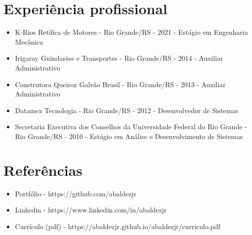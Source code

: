 \documentclass[11pt,oneside,a4paper]{article}
\begin{document}
    \section*{Experiência profissional}
    \begin{itemize}
        \item K-Rios Retífica de Motores - Rio Grande/RS - 2021 - Estágio em Engenharia Mecânica
        \item Irigaray Guindastes e Transportes - Rio Grande/RS - 2014 - Auxiliar Administrativo
        \item Construtora Queiroz Galvão Brasil - Rio Grande/RS - 2013 - Auxiliar Administrativo
        \item Datamex Tecnologia - Rio Grande/RS - 2012 - Desenvolvedor de Sistemas
        \item Secretaria Executiva dos Conselhos da Universidade Federal do Rio Grande - Rio Grande/RS - 2010 - Estágio em Análise e Desenvolvimento de Sistemas
    \end{itemize}
    \section*{Referências}
    \begin{itemize}
        \item Portfólio - https://github.com/abaldezjr
        \item Linkedin - https://www.linkedin.com/in/abaldezjr
        \item Currículo (pdf) - https://abaldezjr.github.io/abaldezjr/curriculo.pdf
    \end{itemize}
\end{document}
